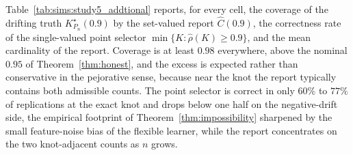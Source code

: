 \documentclass[11pt]{article}
\begin{document}
Table~\ref{tab:sims:study5_addtional} reports, for every cell, the coverage of the drifting truth $K^\star_{P_n}(0.9)$ by the set-valued report $\widehat C(0.9)$, the correctness rate of the single-valued point selector $\min\{K:\hat\rho(K)\ge0.9\}$, and the mean cardinality of the report. Coverage is at least $0.98$ everywhere, above the nominal $0.95$ of Theorem~\ref{thm:honest}, and the excess is expected rather than conservative in the pejorative sense, because near the knot the report typically contains both admissible counts. The point selector is correct in only $60\%$ to $77\%$ of replications at the exact knot and drops below one half on the negative-drift side, the empirical footprint of Theorem~\ref{thm:impossibility} sharpened by the small feature-noise bias of the flexible learner, while the report concentrates on the two knot-adjacent counts as $n$ grows.
\end{document}
